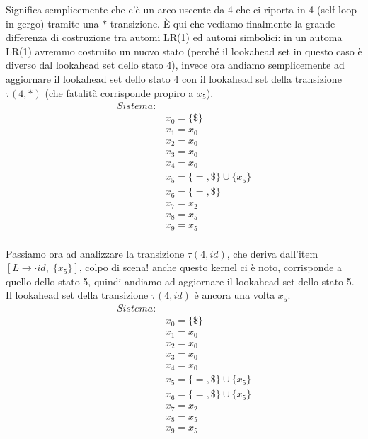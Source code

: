\documentclass[class=book, crop=false, oneside, 12pt]{standalone}
\begin{document}
Significa semplicemente che c'è un arco uscente da 4 che ci riporta in 4 (self loop in gergo) tramite una \(*\)-transizione. È qui che vediamo finalmente la grande differenza di costruzione tra automi LR(1) ed automi simbolici: in un automa LR(1) avremmo costruito un nuovo stato (perché il lookahead set in questo caso è diverso dal lookahead set dello stato 4), invece ora andiamo semplicemente ad aggiornare il lookahead set dello stato 4 con il lookahead set della transizione  \(\tau(4,*)\) (che fatalità corrisponde propiro a \(x_5\)).
\begin{align*}
    Sistema:& \\
            & x_0 = \{\$\} \\
            & x_1 = x_0 \\
            & x_2 = x_0 \\
            & x_3 = x_0 \\
            & x_4 = x_0 \\
            & x_5 = \{=, \$\} \cup \{x_5\} \\
            & x_6 = \{=, \$\} \\
            & x_7 = x_2 \\
            & x_8 = x_5 \\
            & x_9 = x_5 \\
\end{align*}

Passiamo ora ad analizzare la transizione \(\tau(4, id)\), che deriva dall'item \([L \to \cdot id, \; \{x_5\}]\), colpo di scena! anche questo kernel ci è noto, corrisponde a quello dello stato 5, quindi andiamo ad aggiornare il lookahead set dello stato 5.
Il lookahead set della transizione \(\tau(4, id)\) è ancora una volta \(x_5\).
\begin{align*}
    Sistema:& \\
            & x_0 = \{\$\} \\
            & x_1 = x_0 \\
            & x_2 = x_0 \\
            & x_3 = x_0 \\
            & x_4 = x_0 \\
            & x_5 = \{=, \$\} \cup \{x_5\} \\
            & x_6 = \{=, \$\} \cup \{x_5\} \\
            & x_7 = x_2 \\
            & x_8 = x_5 \\
            & x_9 = x_5 \\
\end{align*}
\end{document}
